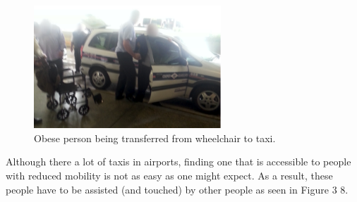 \documentclass[a4paper, 12pt,conference]{new_cit_thesis}
\begin{document}
\begin{list}{-}{}
\begin{figure}[h]
  \centering
     \includegraphics[width=7cm]{images/image039}
   \caption{Obese person being transferred from wheelchair to taxi.}
  \label{fig:39}
\end{figure}

  \item Although there a lot of taxis in airports, finding one that is accessible to people with reduced mobility is not as easy as one might expect. As a result, these people have to be assisted (and touched) by other people as seen in Figure 3 8.
\end{list}
\end{document}
